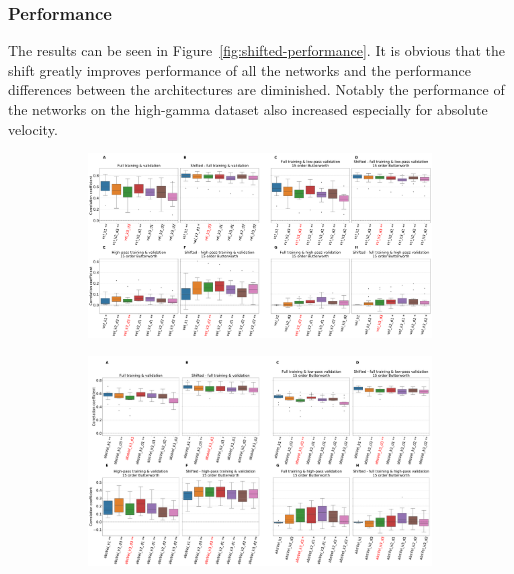 \subsubsection{Performance}
The results can be seen in Figure~\ref{fig:shifted-performance}.
It is obvious that the shift greatly improves performance of all the networks and the performance differences between the architectures are diminished.
Notably the performance of the networks on the high-gamma dataset also increased especially for absolute velocity.
\begin{figure}[!htpb]
\centering
\begin{subfigure}[b]{\textwidth}
   \includegraphics[width=1\linewidth]{img/ch4/shifted_vs_non_shifted_vel_performance_comparison}
   \caption{}
\end{subfigure}\label{fig:shifted-performance-vel}

\begin{subfigure}[b]{\textwidth}
   \includegraphics[width=1\linewidth]{img/ch4/shifted_vs_non_shifted_absVel_performance_comparison}
   \caption{}
\end{subfigure}\label{fig:shifted-performance-absVel}
\caption[]{}
\end{figure}\label{fig:shifted-performance}

